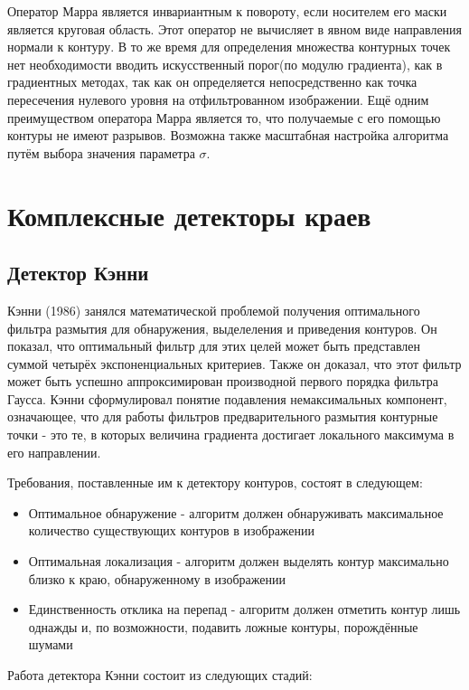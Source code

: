 \documentclass[a4paper,12pt]{report}
\begin{document}
Оператор Марра является инвариантным к повороту, если носителем его маски является круговая область. Этот оператор не вычисляет в явном виде направления нормали к контуру. В то же время для определения множества контурных точек нет необходимости вводить искусственный порог(по модулю градиента), как в градиентных методах, так как он определяется непосредственно как точка пересечения нулевого уровня на отфильтрованном изображении. Ещё одним преимуществом оператора Марра является то, что получаемые с его помощью контуры не имеют разрывов. Возможна также масштабная настройка алгоритма путём выбора значения параметра $\sigma$.
\section{Комплексные детекторы краев}
\subsection{Детектор Кэнни}

Кэнни (1986) занялся математической проблемой получения оптимального фильтра размытия для обнаружения, выделеления и приведения контуров. Он показал, что оптимальный фильтр для этих целей может быть представлен суммой четырёх экспоненциальных критериев. Также он доказал, что этот фильтр может быть успешно аппроксимирован производной первого порядка фильтра Гаусса. Кэнни сформулировал понятие подавления немаксимальных компонент, означающее, что для работы фильтров предварительного размытия контурные точки - это те, в которых величина градиента достигает локального максимума в его направлении.

Требования, поставленные им к детектору контуров, состоят в следующем:
\begin{itemize}
\item{Оптимальное обнаружение - алгоритм должен обнаруживать максимальное количество существующих контуров в изображении}
\item{Оптимальная локализация - алгоритм должен выделять контур максимально близко к краю, обнаруженному в изображении}
\item{Единственность отклика на перепад - алгоритм должен отметить контур лишь однажды и, по возможности, подавить ложные контуры, порождённые шумами}
\end{itemize}

Работа детектора Кэнни состоит из следующих стадий:
\end{document}
